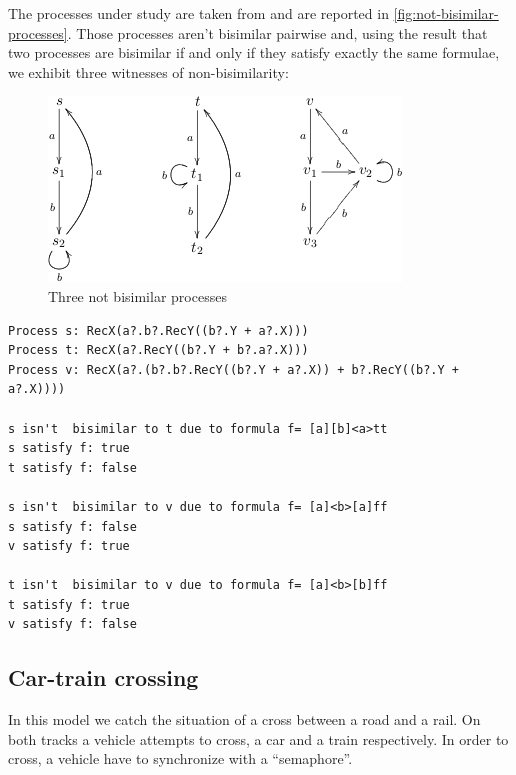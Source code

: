 The processes under study are taken from \cite{1324845} and are
reported in \autoref{fig:not-bisimilar-processes}. Those processes
aren't bisimilar pairwise and, using the result that two processes are
bisimilar if and only if they satisfy exactly the same formulae, we
exhibit three witnesses of non-bisimilarity:
\begin{figure}[htb]
  \centering
  \includegraphics{qualitative-project/not-bisimilar-processes.png}
  \caption{Three not bisimilar processes}
  \label{fig:not-bisimilar-processes}
\end{figure}

\begin{verbatim}
Process s: RecX(a?.b?.RecY((b?.Y + a?.X)))
Process t: RecX(a?.RecY((b?.Y + b?.a?.X)))
Process v: RecX(a?.(b?.b?.RecY((b?.Y + a?.X)) + b?.RecY((b?.Y + a?.X))))

s isn't  bisimilar to t due to formula f= [a][b]<a>tt
s satisfy f: true
t satisfy f: false

s isn't  bisimilar to v due to formula f= [a]<b>[a]ff
s satisfy f: false
v satisfy f: true

t isn't  bisimilar to v due to formula f= [a]<b>[b]ff
t satisfy f: true
v satisfy f: false
\end{verbatim}

\subsection{Car-train crossing}

In this model we catch the situation of a cross between a road and a
rail. On both tracks a vehicle attempts to cross, a car and a train
respectively. In order to cross, a vehicle have to synchronize with a
``semaphore''.

